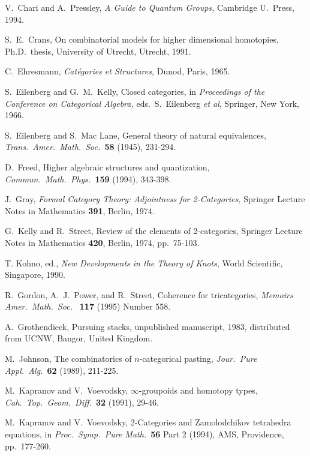 \begin{thebibliography}{10}
 V.\ Chari and A.\ Pressley, {\sl A Guide to 
Quantum Groups,} Cambridge U.\ Press, 1994.

 S.\ E.\ Crans, On combinatorial models for
higher dimensional homotopies, Ph.D.\ thesis, University of Utrecht,
Utrecht, 1991.

 C.\ Ehresmann, {\sl Cat\'egories et Structures,} 
Dunod, Paris, 1965.

 S.\ Eilenberg and G.\ M.\ Kelly, Closed categories, in
{\sl Proceedings of the Conference on Categorical Algebra,} eds.\ S.\
Eilenberg {\it et al}, Springer, New York, 1966.

 S.\ Eilenberg and S.\ Mac Lane, General theory of
natural equivalences, {\sl Trans.\ Amer.\ Math.\ Soc.\ }{\bf 58} (1945), 
231-294.

 D.\ Freed,
Higher algebraic structures and quantization, {\sl Commun.\
Math.\ Phys.\ }{\bf 159} (1994), 343-398.

 J.\ Gray, {\sl Formal Category Theory: Adjointness
for 2-Categories,} Springer Lecture Notes in Mathematics {\bf 391},
Berlin, 1974.

 G.\ Kelly and R.\ Street, Review of the elements of
2-categories, Springer Lecture Notes in Mathematics {\bf 420}, Berlin,
1974, pp.\ 75-103.

 T. Kohno, ed., {\sl New Developments in the Theory of
Knots}, World Scientific, Singapore, 1990.


 R.\ Gordon, A.\ J.\ Power, and R.\ Street, Coherence for
tricategories, {\sl Memoirs Amer.\ Math.\ Soc.\ } {\bf 117} (1995)
Number 558.

 A.\ Grothendieck, Pursuing stacks, unpublished
manuscript, 1983, distributed from UCNW, Bangor, United Kingdom.

\bibitem{Johnson} M.\ Johnson, The combinatorics of $n$-categorical pasting,
{\sl Jour.\ Pure Appl.\ Alg.\ }{\bf 62} (1989), 211-225.

 M.\ Kapranov and V.\ Voevodsky,
$\infty$-groupoids and homotopy types,  {\sl Cah.\ Top.\ Geom.\
Diff.\ }{\bf 32} (1991), 29-46.

\bibitem{KV} M.\ Kapranov and V.\ Voevodsky, 2-Categories and
Zamolodchikov tetrahedra equations, in {\sl Proc.\ Symp.\ Pure
Math.\ }{\bf 56} Part 2 (1994), AMS, Providence, pp.\ 177-260. 


\end{thebibliography}
